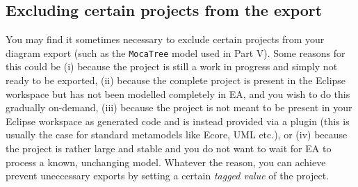 \newpage
\subsection{Excluding certain projects from the export}

You may find it sometimes necessary to exclude certain projects from your diagram export (such as the \texttt{MocaTree} model used in Part V).
Some reasons for this could be (i) because the project is still a work in progress and simply not ready to be exported, (ii) because the
complete project is present in the Eclipse workspace but has not been modelled completely in EA, and you wish to do this gradually on-demand, (iii) because the
project is not meant to be present in your Eclipse workspace as generated code and is instead provided via a plugin (this is usually the case for standard
metamodels like Ecore, UML etc.), or (iv) because the project is rather large and stable and you do not want to wait for EA to process a known, unchanging
model. Whatever the reason, you can achieve prevent uneccessary exports by setting a certain \emph{tagged value} of the project.

